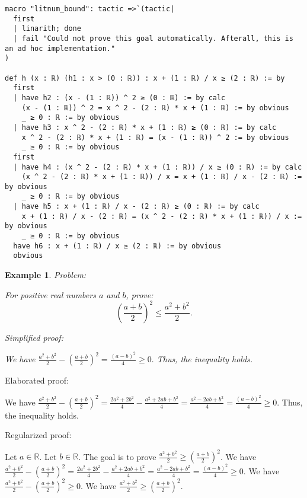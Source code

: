 \documentclass{article}
\newtheorem{example}{Example}
\begin{document}
\begin{tcolorbox}[colback=white!10, width=\linewidth]
\begin{lstlisting}[language=Lean4]
macro "litnum_bound": tactic =>`(tactic|
  first
  | linarith; done
  | fail "Could not prove this goal automatically. Afterall, this is an ad hoc implementation."
)

def h (x : ℝ) (h1 : x > (0 : ℝ)) : x + (1 : ℝ) / x ≥ (2 : ℝ) := by
  first
  | have h2 : (x - (1 : ℝ)) ^ 2 ≥ (0 : ℝ) := by calc
    (x - (1 : ℝ)) ^ 2 = x ^ 2 - (2 : ℝ) * x + (1 : ℝ) := by obvious
    _ ≥ 0 : ℝ := by obvious
  | have h3 : x ^ 2 - (2 : ℝ) * x + (1 : ℝ) ≥ (0 : ℝ) := by calc
    x ^ 2 - (2 : ℝ) * x + (1 : ℝ) = (x - (1 : ℝ)) ^ 2 := by obvious
    _ ≥ 0 : ℝ := by obvious
  first
  | have h4 : (x ^ 2 - (2 : ℝ) * x + (1 : ℝ)) / x ≥ (0 : ℝ) := by calc
    (x ^ 2 - (2 : ℝ) * x + (1 : ℝ)) / x = x + (1 : ℝ) / x - (2 : ℝ) := by obvious
    _ ≥ 0 : ℝ := by obvious
  | have h5 : x + (1 : ℝ) / x - (2 : ℝ) ≥ (0 : ℝ) := by calc
    x + (1 : ℝ) / x - (2 : ℝ) = (x ^ 2 - (2 : ℝ) * x + (1 : ℝ)) / x := by obvious
    _ ≥ 0 : ℝ := by obvious
  have h6 : x + (1 : ℝ) / x ≥ (2 : ℝ) := by obvious
  obvious

\end{lstlisting}
\end{tcolorbox}


\begin{example}
Problem:
\begin{tcolorbox}[colback=yellow!10, width=\linewidth]
For positive real numbers $a$ and $b$, prove:
    $$\left(\frac{a+b}{2}\right)^2 \leq \frac{a^2+b^2}{2}.$$
\end{tcolorbox}

Simplified proof:
\begin{tcolorbox}[colback=blue!10, width=\linewidth]
We have
$ \frac{a^2+b^2}{2} - \left(\frac{a+b}{2}\right)^2 = \frac{(a-b)^2}{4} \ge 0. $
Thus, the inequality holds.
\end{tcolorbox}
\end{example}

Elaborated proof:
\begin{tcolorbox}[colback=green!10, width=\linewidth]
We have
$ \frac{a^2+b^2}{2} - \left(\frac{a+b}{2}\right)^2 = \frac{2a^2+2b^2}{4} - \frac{a^2+2ab+b^2}{4} = \frac{a^2-2ab+b^2}{4} = \frac{(a-b)^2}{4} \ge 0. $
Thus, the inequality holds.
\end{tcolorbox}

Regularized proof:
\begin{tcolorbox}[colback=red!10, width=\linewidth]
Let $a\in\mathbb{R}$.
Let $b\in\mathbb{R}$.
The goal is to prove $\frac{a^2+b^2}{2} \ge {\left(\frac{a+b}{2}\right)}^2$.
We have $\frac{a^2+b^2}{2} - {\left(\frac{a+b}{2}\right)}^2 = \frac{2a^2+2b^2}{4} - \frac{a^2+2ab+b^2}{4} = \frac{a^2-2ab+b^2}{4} = \frac{{{(a-b)}}^2}{4} \ge 0$.
We have $\frac{a^2+b^2}{2} - {\left(\frac{a+b}{2}\right)}^2 \ge 0$.
We have $\frac{a^2+b^2}{2} \ge {\left(\frac{a+b}{2}\right)}^2$.
\end{tcolorbox}
\end{document}
